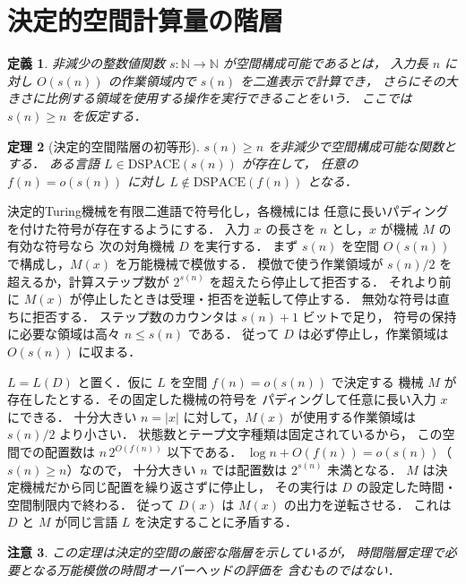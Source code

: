 \documentclass[a5paper,10pt,onecolumn]{jsarticle}
\makeatletter
\theoremstyle{mathnotetheorem}
\newtheorem{theorem}{定理}[section]
\newtheorem{definition}[theorem]{定義}
\newtheorem{remark}[theorem]{注意}
\renewcommand{\proofname}{証明}
\renewenvironment{proof}[1][\proofname]{%
  \par\pushQED{\qed}\normalfont\topsep4\p@\@plus2\p@\relax
  \trivlist\item[\hskip\labelsep\bfseries #1]\ignorespaces
}{\popQED\endtrivlist\@endpefalse}
\makeatother
\begin{document}
\section{決定的空間計算量の階層}
\begin{definition}
非減少の整数値関数 $s:\mathbb N\to\mathbb N$ が空間構成可能であるとは，
入力長 $n$ に対し $O(s(n))$ の作業領域内で $s(n)$ を二進表示で計算でき，
さらにその大きさに比例する領域を使用する操作を実行できることをいう．
ここでは $s(n)\ge n$ を仮定する．
\end{definition}
\begin{theorem}[決定的空間階層の初等形]
$s(n)\ge n$ を非減少で空間構成可能な関数とする．
ある言語 $L\in\mathrm{DSPACE}(s(n))$ が存在して，
任意の $f(n)=o(s(n))$ に対し
$L\notin\mathrm{DSPACE}(f(n))$ となる．
\end{theorem}
\begin{proof}
決定的Turing機械を有限二進語で符号化し，各機械には
任意に長いパディングを付けた符号が存在するようにする．
入力 $x$ の長さを $n$ とし，$x$ が機械 $M$ の有効な符号なら
次の対角機械 $D$ を実行する．
まず $s(n)$ を空間 $O(s(n))$ で構成し，$M(x)$ を万能機械で模倣する．
模倣で使う作業領域が $s(n)/2$ を超えるか，計算ステップ数が
$2^{s(n)}$ を超えたら停止して拒否する．
それより前に $M(x)$ が停止したときは受理・拒否を逆転して停止する．
無効な符号は直ちに拒否する．
ステップ数のカウンタは $s(n)+1$ ビットで足り，
符号の保持に必要な領域は高々 $n\le s(n)$ である．
従って $D$ は必ず停止し，作業領域は $O(s(n))$ に収まる．

$L=L(D)$ と置く．仮に $L$ を空間 $f(n)=o(s(n))$ で決定する
機械 $M$ が存在したとする．その固定した機械の符号を
パディングして任意に長い入力 $x$ にできる．
十分大きい $n=|x|$ に対して，$M(x)$ が使用する作業領域は
$s(n)/2$ より小さい．
状態数とテープ文字種類は固定されているから，
この空間での配置数は
$n\,2^{O(f(n))}$ 以下である．
$\log n+O(f(n))=o(s(n))$（$s(n)\ge n$）なので，
十分大きい $n$ では配置数は $2^{s(n)}$ 未満となる．
$M$ は決定機械だから同じ配置を繰り返さずに停止し，
その実行は $D$ の設定した時間・空間制限内で終わる．
従って $D(x)$ は $M(x)$ の出力を逆転させる．
これは $D$ と $M$ が同じ言語 $L$ を決定することに矛盾する．
\end{proof}
\begin{remark}
この定理は決定的空間の厳密な階層を示しているが，
時間階層定理で必要となる万能模倣の時間オーバーヘッドの評価を
含むものではない．
\end{remark}
\end{document}
